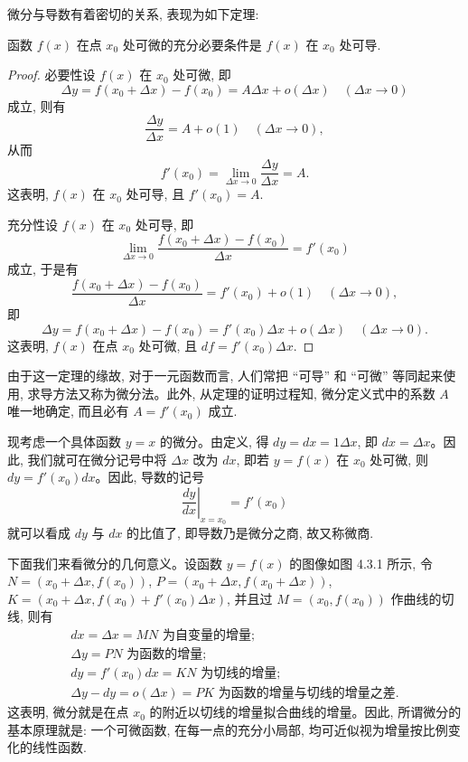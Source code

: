 微分与导数有着密切的关系, 表现为如下定理:

\begin{theorem}\label{theorem:ma-4-3-1}
函数 $f(x)$ 在点 $x_0$ 处可微的充分必要条件是 $f(x)$ 在 $x_0$ 处可导.
\end{theorem}


\begin{proof}
必要性\quad 设 $f(x)$ 在 $x_0$ 处可微, 即
\[
  \Delta y=f(x_0+\Delta x)-f(x_0)=A\Delta x+o(\Delta x)
  \quad(\Delta x\to0)
\]
成立, 则有
\[
  \frac{\Delta y}{\Delta x}
  =
  A+o(1)
  \quad(\Delta x\to0),
\]
从而
\[
  f'(x_0)
  =
  \lim_{\Delta x\to0}\frac{\Delta y}{\Delta x}
  =
  A.
\]
这表明, $f(x)$ 在 $x_0$ 处可导, 且 $f'(x_0)=A$.

充分性\quad 设 $f(x)$ 在 $x_0$ 处可导, 即
\[
  \lim_{\Delta x\to0}
  \frac{f(x_0+\Delta x)-f(x_0)}{\Delta x}
  =
  f'(x_0)
\]
成立, 于是有
\[
  \frac{f(x_0+\Delta x)-f(x_0)}{\Delta x}
  =
  f'(x_0)+o(1)
  \quad(\Delta x\to0),
\]
即
\[
  \Delta y=f(x_0+\Delta x)-f(x_0)
  =
  f'(x_0)\Delta x+o(\Delta x)
  \quad(\Delta x\to0).
\]
这表明, $f(x)$ 在点 $x_0$ 处可微, 且 $df=f'(x_0)\Delta x$.
\end{proof}


\begin{remark}\label{remark:ma-4-source-62}
由于这一定理的缘故, 对于一元函数而言, 人们常把 ``可导'' 和 ``可微'' 等同起来使用, 求导方法又称为微分法。此外, 从定理的证明过程知, 微分定义式中的系数 $A$ 唯一地确定, 而且必有 $A=f'(x_0)$ 成立.
\end{remark}

现考虑一个具体函数 $y=x$ 的微分。由定义, 得 $dy=dx=1\Delta x$, 即 $dx=\Delta x$。因此, 我们就可在微分记号中将 $\Delta x$ 改为 $dx$, 即若 $y=f(x)$ 在 $x_0$ 处可微, 则 $dy=f'(x_0)dx$。因此, 导数的记号
\[
  \left.\frac{dy}{dx}\right|_{x=x_0}=f'(x_0)
\]
就可以看成 $dy$ 与 $dx$ 的比值了, 即导数乃是微分之商, 故又称微商.

下面我们来看微分的几何意义。设函数 $y=f(x)$ 的图像如图 4.3.1 所示, 令 $N=(x_0+\Delta x,f(x_0))$, $P=(x_0+\Delta x,f(x_0+\Delta x))$, $K=(x_0+\Delta x,f(x_0)+f'(x_0)\Delta x)$, 并且过 $M=(x_0,f(x_0))$ 作曲线的切线, 则有
\[
\begin{gathered}
  dx=\Delta x=MN\text{ 为自变量的增量;}\\
  \Delta y=PN\text{ 为函数的增量;}\\
  dy=f'(x_0)dx=KN\text{ 为切线的增量;}\\
  \Delta y-dy=o(\Delta x)=PK\text{ 为函数的增量与切线的增量之差.}
\end{gathered}
\]
这表明, 微分就是在点 $x_0$ 的附近以切线的增量拟合曲线的增量。因此, 所谓微分的基本原理就是: 一个可微函数, 在每一点的充分小局部, 均可近似视为增量按比例变化的线性函数.


